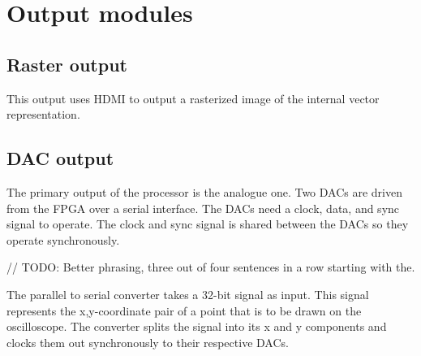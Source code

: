 \chapter{Output modules}

\section{Raster output}

This output uses HDMI to output a rasterized image of the internal vector representation.

\section{DAC output}

The primary output of the processor is the analogue one.
Two DACs are driven from the FPGA over a serial interface.
The DACs need a clock, data, and sync signal to operate. 
The clock and sync signal is shared between the DACs so they operate synchronously. 

// TODO: Better phrasing, three out of four sentences in a row starting with the.

The parallel to serial converter takes a 32-bit signal as input.
This signal represents the x,y-coordinate pair of a point that is to be drawn on the oscilloscope.
The converter splits the signal into its x and y components and clocks them out synchronously to their respective DACs.
